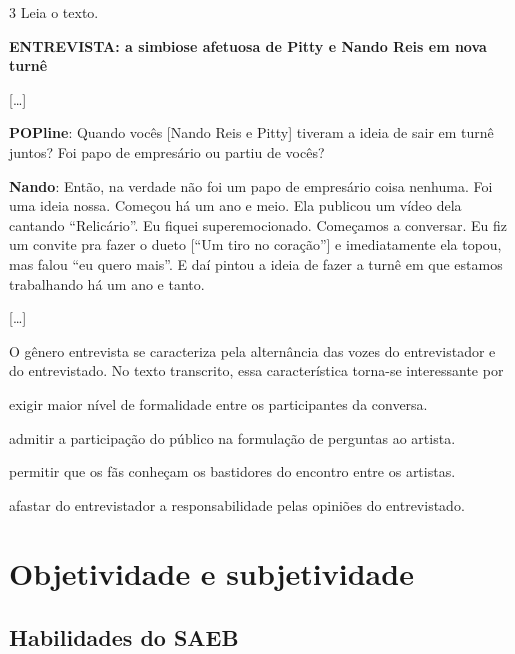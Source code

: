 \pagebreak

\num{3} Leia o texto.

\begin{myquote}
\textbf{ENTREVISTA: a simbiose afetuosa de Pitty e Nando Reis em nova
turnê}

{[}\ldots{]}

\textbf{POPline}: Quando vocês {[}Nando Reis e Pitty{]} tiveram a ideia
de sair em turnê juntos? Foi papo de empresário ou partiu de vocês?

\textbf{Nando}: Então, na verdade não foi um papo de empresário coisa
nenhuma. Foi uma ideia nossa. Começou há um ano e meio. Ela publicou um
vídeo dela cantando ``Relicário''. Eu fiquei superemocionado. Começamos
a conversar. Eu fiz um convite pra fazer o dueto {[}``Um tiro no
coração''{]} e imediatamente ela topou, mas falou ``eu quero mais''. E
daí pintou a ideia de fazer a turnê em que estamos trabalhando há um ano
e tanto.

{[}\ldots{]}

\end{myquote}

O gênero entrevista se caracteriza pela alternância das vozes do
entrevistador e do entrevistado. No texto transcrito, essa
característica torna-se interessante por

\begin{escolha}
\item exigir maior nível de formalidade entre os participantes da conversa.

\item admitir a participação do público na formulação de perguntas ao
artista.

\item permitir que os fãs conheçam os bastidores do encontro entre os
artistas.

\item afastar do entrevistador a responsabilidade pelas opiniões do
entrevistado.
\end{escolha}

\chapter{Objetividade e subjetividade}

\section*{Habilidades do SAEB}

